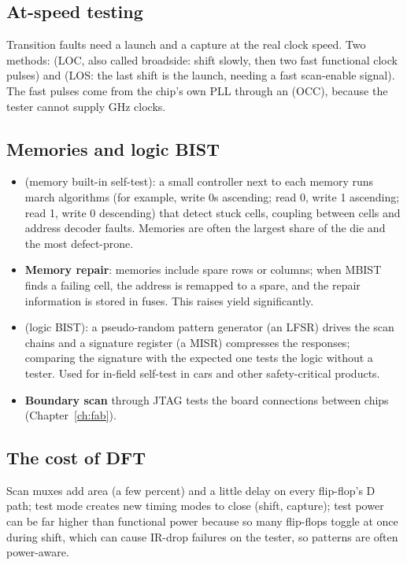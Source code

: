 \subsection*{At-speed testing}

Transition faults need a launch and a capture at the real clock speed. Two methods:  (LOC, also called broadside: shift slowly, then two fast functional clock pulses) and  (LOS: the last shift is the launch, needing a fast scan-enable signal). The fast pulses come from the chip's own PLL through an  (OCC), because the tester cannot supply GHz clocks.

\subsection*{Memories and logic BIST}

\begin{itemize}
  \item {} (memory built-in self-test): a small controller next to each memory runs march algorithms (for example, write 0s ascending; read 0, write 1 ascending; read 1, write 0 descending) that detect stuck cells, coupling between cells and address decoder faults. Memories are often the largest share of the die and the most defect-prone.
  \item \textbf{Memory repair}: memories include spare rows or columns; when MBIST finds a failing cell, the address is remapped to a spare, and the repair information is stored in fuses. This raises yield significantly.
  \item {} (logic BIST): a pseudo-random pattern generator (an LFSR) drives the scan chains and a signature register (a MISR) compresses the responses; comparing the signature with the expected one tests the logic without a tester. Used for in-field self-test in cars and other safety-critical products.
  \item \textbf{Boundary scan} through JTAG tests the board connections between chips (Chapter~\ref{ch:fab}).
\end{itemize}

\subsection*{The cost of DFT}

Scan muxes add area (a few percent) and a little delay on every flip-flop's D path; test mode creates new timing modes to close (shift, capture); test power can be far higher than functional power because so many flip-flops toggle at once during shift, which can cause IR-drop failures on the tester, so patterns are often power-aware.

